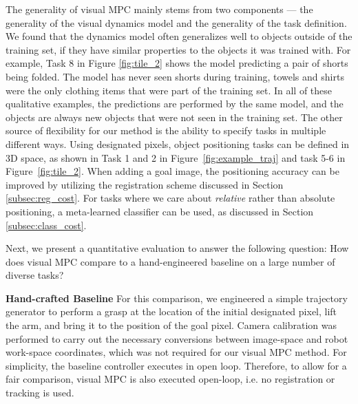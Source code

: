 
The generality of visual MPC mainly stems from two components --- the generality of the visual dynamics model and the generality of the task definition.
We found that the dynamics model often generalizes well to objects outside of the training set, if they have similar properties to the objects it was trained with. For example, Task 8 in Figure \ref{fig:tile_2} shows the model predicting a pair of shorts being folded. The model has never seen shorts during training, towels and shirts were the only clothing items that were part of the training set. In all of these qualitative examples, the predictions are performed by the same model, and the objects are always new objects that were not seen in the training set.
The other source of flexibility for our method is the ability to specify tasks in multiple different ways. Using designated pixels, object positioning tasks can be defined in 3D space, as shown in Task 1 and 2 in Figure~\ref{fig:example_traj} and task 5-6 in Figure~\ref{fig:tile_2}. When adding a goal image, the positioning accuracy can be improved by utilizing the registration scheme discussed in Section \ref{subsec:reg_cost}.
For tasks where we care about \emph{relative} rather than absolute positioning, a meta-learned classifier can be used, as discussed in Section \ref{subsec:class_cost}.

Next, we present a quantitative evaluation to answer the following question: How does visual MPC compare to a hand-engineered baseline on a large number of diverse tasks?

\noindent \textbf{Hand-crafted Baseline} For this comparison, we engineered a simple trajectory generator to perform a grasp at the location of the initial designated pixel, lift the arm, and bring it to the position of the goal pixel. Camera calibration was performed to carry out the necessary conversions between image-space and robot work-space coordinates, which was not required for our visual MPC method. For simplicity, the baseline controller executes in open loop. Therefore, to allow for a fair comparison, visual MPC is also executed open-loop, i.e. no registration or tracking is used.

